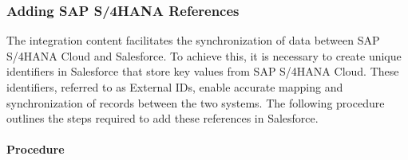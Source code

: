 \subsubsection{Adding SAP S/4HANA References}
The integration content facilitates the synchronization of data between SAP S/4HANA Cloud and Salesforce. To achieve this, it is necessary to create unique identifiers in Salesforce that store key values from SAP S/4HANA Cloud. These identifiers, referred to as External IDs, enable accurate mapping and synchronization of records between the two systems. The following procedure outlines the steps required to add these references in Salesforce.

\paragraph{Procedure}
